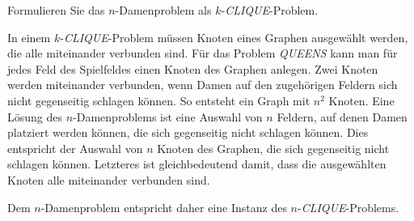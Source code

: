 Formulieren Sie das $n$-Damenproblem als $k$-\textit{CLIQUE}-Problem.


\begin{loesung}
In einem $k$-\textit{CLIQUE}-Problem müssen Knoten eines Graphen
ausgewählt werden, die alle miteinander verbunden sind.
Für das Problem \textit{QUEENS} kann man für jedes Feld des Spielfeldes
einen Knoten des Graphen anlegen.
Zwei Knoten werden miteinander verbunden, wenn Damen auf den zugehörigen
Feldern sich nicht gegenseitig schlagen können.
So entsteht ein Graph mit $n^2$ Knoten.
Eine Lösung des $n$-Damenproblems ist eine Auswahl von $n$ Feldern,
auf denen Damen platziert werden können, die sich gegenseitig
nicht schlagen können.
Dies entspricht der Auswahl von $n$ Knoten des Graphen, die sich
gegenseitig nicht schlagen können.
Letzteres ist gleichbedeutend damit, dass die ausgewählten Knoten
alle miteinander verbunden sind.

Dem $n$-Damenproblem entspricht daher eine Instanz des
$n$-\textit{CLIQUE}-Problems.
\end{loesung}
